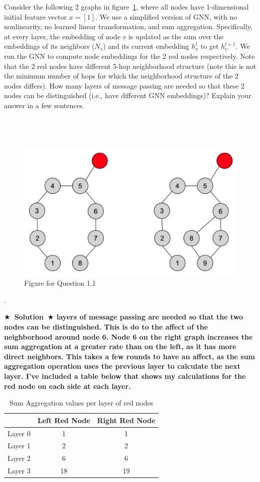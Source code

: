 \documentclass{article}
\numberwithin{figure}{section}
\newcommand{\Solution}[1]{{\medskip \color{red} \bf $\bigstar$~\sf \textbf{Solution}~$\bigstar$ \sf #1 } \bigskip}
\begin{document}
Consider the following 2 graphs in figure~\ref{fig:Q4.1}, where all nodes have 1-dimensional initial feature vector $x = [1]$. We use a simplified version of GNN, with no nonlinearity,
no learned linear transformation, and sum aggregation. Specifically, at every
layer, the embedding of node $v$ is updated as the sum over the embeddings of
its neighbors ($N_v$) and its current embedding $h^t_v$ to get $h^{t+1}_v$. We run the GNN
to compute node embeddings for the 2 red nodes respectively. Note that the 2 red nodes have different 5-hop neighborhood structure (note this is not the minimum number of hops for which the neighborhood structure of the 2 nodes differs). How many layers of message passing are needed so that these 2 nodes can be distinguished (i.e., have different GNN embeddings)? Explain your answer in a few sentences.
\\\\\\\\
\begin{figure}[!htb]
\centering
  \includegraphics[width=0.6\columnwidth]{CS224W_Homework1/fig4-1.png}
  \caption{Figure for Question 1.1}
  \label{fig:Q4.1}
\end{figure}

.\\

\Solution{3 layers of message passing are needed so that the two nodes can be distinguished. This is do to the affect of the neighborhood around node 6. Node 6 on the right graph increases the sum aggregation at a greater rate than on the left, as it has more direct neighbors. This takes a few rounds to have an affect, as the sum aggregation operation uses the previous layer to calculate the next layer. I've included a table below that shows my calculations for the red node on each side at each layer.
\begin{table}[h]
\centering
\color{red} \caption{Sum Aggregation values per layer of red nodes}
\label{tab:my_table}
\color{red}\begin{tabular}{|c|c|c|}
\hline
 & Left Red Node & Right Red Node \\
\hline
Layer 0 & 1 & 1 \\
\hline
Layer 1 & 2 & 2 \\
\hline
Layer 2 & 6 & 6 \\
\hline
Layer 3 & 18 & 19 \\
\hline
\end{tabular}
\end{table}
}
\end{document}
